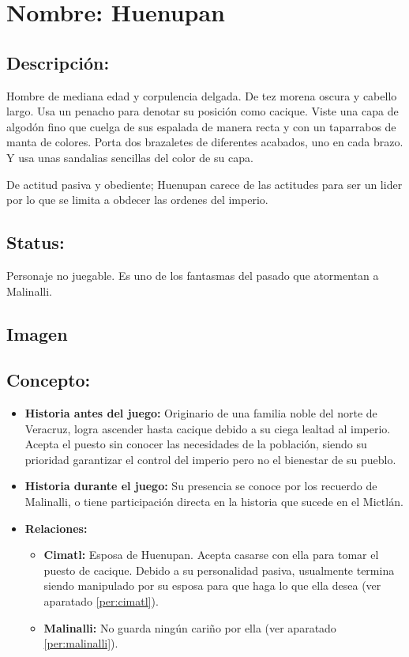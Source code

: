 \section{Nombre: Huenupan}  \label{per:huenupan}
\subsection{Descripción:} 
Hombre de mediana edad y corpulencia delgada. De tez morena oscura y cabello largo. Usa un penacho para denotar su posición como cacique. Viste una capa de algodón fino que cuelga de sus espalada de manera recta y con un taparrabos de manta de colores. Porta dos brazaletes de diferentes acabados, uno en cada brazo. Y usa unas sandalias sencillas del color de su capa.     
\\
\par
De actitud pasiva y obediente; Huenupan carece de las actitudes para ser un lider por lo que se limita a obdecer las ordenes del imperio. 
\subsection{Status:}
Personaje no juegable.
Es uno de los fantasmas del pasado que atormentan a Malinalli.
\subsection{Imagen}
\subsection{Concepto:}
\begin{itemize}
	\item \textbf{Historia antes del juego:}
	Originario de una familia noble del  norte de Veracruz, logra ascender hasta cacique debido a su ciega lealtad al imperio. Acepta el puesto sin conocer las necesidades de la población, siendo su prioridad garantizar el control del imperio pero no el bienestar de su pueblo.  
	\item \textbf{Historia durante el juego:}
	Su presencia se conoce por los recuerdo de Malinalli, o tiene participación directa en la historia que sucede en el Mictlán.
	\item \textbf{Relaciones:}
	\begin{itemize}
		\item \textbf{Cimatl:} Esposa de Huenupan. Acepta casarse con ella para tomar el puesto de cacique. Debido a su personalidad pasiva, usualmente termina siendo manipulado por su esposa para que haga lo que ella desea (ver aparatado \ref{per:cimatl}). 
		\item \textbf{Malinalli:} No guarda ningún cariño por ella (ver aparatado \ref{per:malinalli}). 
	\end{itemize}                     
\end{itemize}

